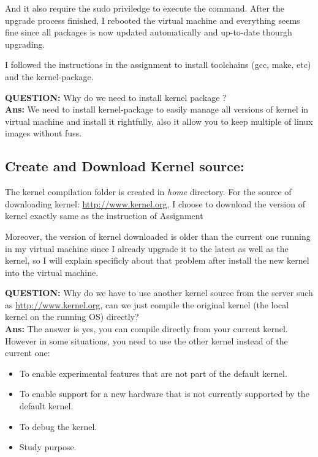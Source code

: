 \documentclass[a4paper, 11pt]{article}
\begin{document}
\par{And it also require the sudo priviledge to execute the command. After the upgrade process finished, I rebooted the virtual machine and everything seems fine since all packages is now updated automatically and up-to-date thourgh upgrading.} 

\par{I followed the instructions in the assignment to install toolchains (gcc, make, etc) and the kernel-package}.

\textbf{QUESTION:} Why do we need to install kernel package ? \\
\textbf{Ans:} We need to install kernel-package to easily manage all versions of kernel in virtual machine and install it rightfully, also it allow you to keep multiple of linux images without fuss.

\bigbreak
\subsection{Create and Download Kernel source:}

\par{The kernel compilation folder is created in \textit{home} directory. For the source of downloading kernel: \url{ http://www.kernel.org}, I choose to download the version of kernel exactly same as the instruction of Assignment}

\par{Moreover, the version of kernel downloaded is older than the current one running in my virtual machine since I already upgrade it to the latest as well as the kernel, so I will explain specificly about that problem after install the new kernel into the virtual machine.}

\textbf{QUESTION:} Why do we have to use another kernel source from the server such as \url{http://www.kernel.org},
can we just compile the original kernel (the local kernel on the running OS) directly? \\
\textbf{Ans:} The answer is yes, you can compile directly from your current kernel. However in some situations, you need to use the other kernel instead of the current one:
\begin{itemize}
    \item To enable experimental features that are not part of the default kernel.
    \item To enable support for a new hardware that is not currently supported by the default kernel.
    \item To debug the kernel.
    \item Study purpose.
\end{itemize}
\end{document}
